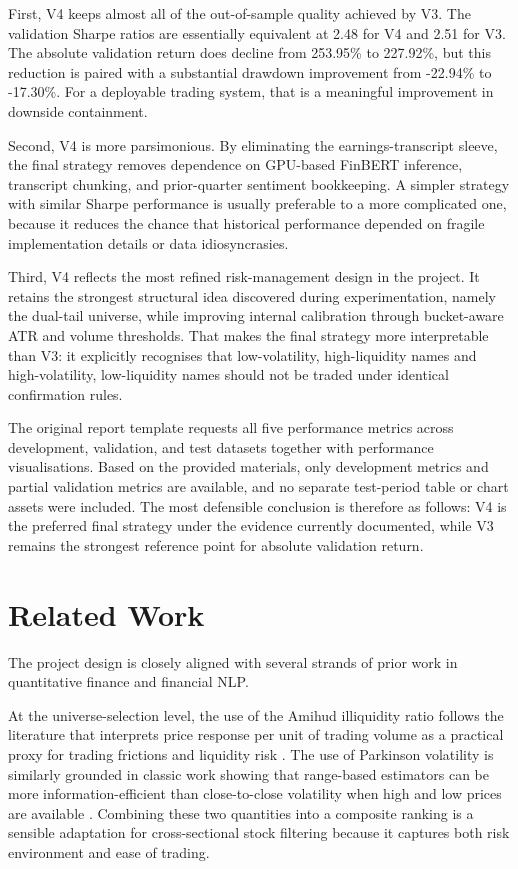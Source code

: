\documentclass[11pt,twoside,a4paper]{article}
\begin{document}
First, V4 keeps almost all of the out-of-sample quality achieved by V3. The validation Sharpe ratios are essentially equivalent at 2.48 for V4 and 2.51 for V3. The absolute validation return does decline from 253.95\% to 227.92\%, but this reduction is paired with a substantial drawdown improvement from -22.94\% to -17.30\%. For a deployable trading system, that is a meaningful improvement in downside containment.

Second, V4 is more parsimonious. By eliminating the earnings-transcript sleeve, the final strategy removes dependence on GPU-based FinBERT inference, transcript chunking, and prior-quarter sentiment bookkeeping. A simpler strategy with similar Sharpe performance is usually preferable to a more complicated one, because it reduces the chance that historical performance depended on fragile implementation details or data idiosyncrasies.

Third, V4 reflects the most refined risk-management design in the project. It retains the strongest structural idea discovered during experimentation, namely the dual-tail universe, while improving internal calibration through bucket-aware ATR and volume thresholds. That makes the final strategy more interpretable than V3: it explicitly recognises that low-volatility, high-liquidity names and high-volatility, low-liquidity names should not be traded under identical confirmation rules.

The original report template requests all five performance metrics across development, validation, and test datasets together with performance visualisations. Based on the provided materials, only development metrics and partial validation metrics are available, and no separate test-period table or chart assets were included. The most defensible conclusion is therefore as follows: V4 is the preferred final strategy under the evidence currently documented, while V3 remains the strongest reference point for absolute validation return.

\section{Related Work}
The project design is closely aligned with several strands of prior work in quantitative finance and financial NLP.

At the universe-selection level, the use of the Amihud illiquidity ratio follows the literature that interprets price response per unit of trading volume as a practical proxy for trading frictions and liquidity risk \cite{amihud2002}. The use of Parkinson volatility is similarly grounded in classic work showing that range-based estimators can be more information-efficient than close-to-close volatility when high and low prices are available \cite{parkinson1980}. Combining these two quantities into a composite ranking is a sensible adaptation for cross-sectional stock filtering because it captures both risk environment and ease of trading.
\end{document}
